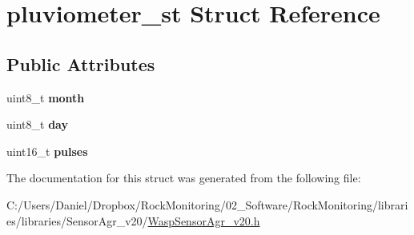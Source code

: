 \hypertarget{structpluviometer__st}{}\section{pluviometer\+\_\+st Struct Reference}
\label{structpluviometer__st}
\subsection*{Public Attributes}
\begin{DoxyCompactItemize}
\item 
uint8\+\_\+t {\bfseries month}\hypertarget{structpluviometer__st_a5167eb07e73e0b1f39c1b54a228f75d0}{}\label{structpluviometer__st_a5167eb07e73e0b1f39c1b54a228f75d0}

\item 
uint8\+\_\+t {\bfseries day}\hypertarget{structpluviometer__st_a9bde2b74a1546b839f133f075ae546a6}{}\label{structpluviometer__st_a9bde2b74a1546b839f133f075ae546a6}

\item 
uint16\+\_\+t {\bfseries pulses}\hypertarget{structpluviometer__st_a568f8ed83db29f814fce1b402e10343d}{}\label{structpluviometer__st_a568f8ed83db29f814fce1b402e10343d}

\end{DoxyCompactItemize}


The documentation for this struct was generated from the following file\+:\begin{DoxyCompactItemize}
\item 
C\+:/\+Users/\+Daniel/\+Dropbox/\+Rock\+Monitoring/02\+\_\+\+Software/\+Rock\+Monitoring/libraries/libraries/\+Sensor\+Agr\+\_\+v20/\hyperlink{_wasp_sensor_agr__v20_8h}{Wasp\+Sensor\+Agr\+\_\+v20.\+h}\end{DoxyCompactItemize}
